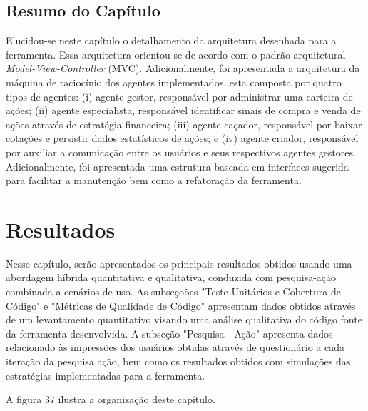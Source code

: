 \section{Resumo do Capítulo}

Elucidou-se neste capítulo o detalhamento da arquitetura desenhada para a ferramenta. Essa arquitetura orientou-se de acordo com o padrão arquitetural \textit{Model-View-Controller} (MVC). Adicionalmente, foi apresentada a arquitetura da máquina de raciocínio dos agentes implementados, esta composta por quatro tipos de agentes: (i) agente gestor, responsável por administrar uma carteira de ações; (ii) agente especialista, responsável identificar sinais de compra e venda de ações através de estratégia financeira; (iii) agente caçador,  responsável por baixar cotações e persistir dados estatísticos de ações; e (iv) agente criador, responsável por auxiliar a comunicação entre os usuários e seus respectivos agentes gestores.
Adicionalmente, foi apresentada uma estrutura baseada em interfaces sugerida para facilitar a manutenção bem como a refatoração da ferramenta.  


\newpage
\chapter[RESULTADOS]{Resultados}

Nesse capítulo, serão apresentados os principais resultados obtidos usando uma abordagem híbrida quantitativa e qualitativa, conduzida com pesquisa-ação combinada a cenários de uso. As subseçoões "Teste Unitários e Cobertura de Código"  e  "Métricas de Qualidade de Código"  apresentam dados obtidos através de um levantamento quantitativo visando uma análise qualitativa do código fonte da ferramenta desenvolvida. A subseção "Pesquisa - Ação"  apresenta dados relacionado às impressões dos usuários obtidas através de questionário a cada iteração da pesquisa ação, bem como os resultados obtidos com simulações das estratégias implementadas para a ferramenta. 

A figura 37 ilustra a organização deste capítulo.

